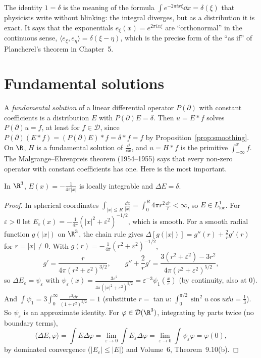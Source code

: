 \begin{beauty}
The identity $\hat1=\delta$ is the meaning of the formula $\int e^{-2\pi ix\xi}\dd x=\delta(\xi)$ that physicists write without blinking: the integral diverges, but as a distribution it is exact. It says that the
exponentials $e_\xi(x)=e^{2\pi ix\xi}$ are ``orthonormal'' in the continuous sense, $\langle e_\xi,e_\eta\rangle=\delta(\xi-\eta)$, which is the precise form of the ``as if'' of Plancherel's theorem in Chapter~5.
\end{beauty}

\section{Fundamental solutions}

A \emph{fundamental solution} of a linear differential operator $P(\partial)$ with constant coefficients is a distribution $E$ with $P(\partial)E=\delta$. Then $u=E*f$ solves $P(\partial)u=f$, at least for $f\in\mathcal D$, since
$P(\partial)(E*f)=(P(\partial)E)*f=\delta*f=f$ by Proposition~\ref{prop:smoothing}. On $\R$, $H$ is a fundamental solution of $\frac{\dd}{\dd x}$, and $u=H*f$ is the primitive $\int_{-\infty}^xf$. The Malgrange--Ehrenpreis theorem
(1954--1955) says that every non-zero operator with constant coefficients has one. Here is the most important.

\begin{theorem}\label{thm:newton}
In $\R^3$, $E(x)=-\frac1{4\pi|x|}$ is locally integrable and $\Delta E=\delta$.
\end{theorem}
\begin{proof}
In spherical coordinates $\int_{|x|\le R}\frac{\dd x}{|x|}=\int_0^R4\pi r^2\frac{\dd r}r<\infty$, so $E\in L^1_{\mathrm{loc}}$. For $\varepsilon>0$ let $E_\varepsilon(x)=-\frac1{4\pi}(|x|^2+\varepsilon^2)^{-1/2}$, which is smooth. For a smooth radial function $g(|x|)$
on $\R^3$, the chain rule gives $\Delta[g(|x|)]=g''(r)+\frac2rg'(r)$ for $r=|x|\ne0$. With $g(r)=-\frac1{4\pi}(r^2+\varepsilon^2)^{-1/2}$,
\[g'=\frac{r}{4\pi(r^2+\varepsilon^2)^{3/2}},\qquad g''+\frac2rg'=\frac{3(r^2+\varepsilon^2)-3r^2}{4\pi(r^2+\varepsilon^2)^{5/2}},\]
so $\Delta E_\varepsilon=\psi_\varepsilon$ with $\psi_\varepsilon(x)=\frac{3\varepsilon^2}{4\pi(|x|^2+\varepsilon^2)^{5/2}}=\varepsilon^{-3}\psi_1(\frac x\varepsilon)$ (by continuity, also at $0$). And $\int\psi_1=3\int_0^\infty\frac{r^2\dd r}{(1+r^2)^{5/2}}=1$ (substitute
$r=\tan u$: $\int_0^{\pi/2}\sin^2u\cos u\dd u=\frac13$). So $\psi_\varepsilon$ is an approximate identity. For $\varphi\in\mathcal D(\R^3)$, integrating by parts twice (no boundary terms),
\[\langle\Delta E,\varphi\rangle=\int E\Delta\varphi=\lim_{\varepsilon\to0}\int E_\varepsilon\Delta\varphi=\lim_{\varepsilon\to0}\int\psi_\varepsilon\varphi=\varphi(0),\]
by dominated convergence ($|E_\varepsilon|\le|E|$) and Volume~6, Theorem~9.10(b).
\end{proof}

